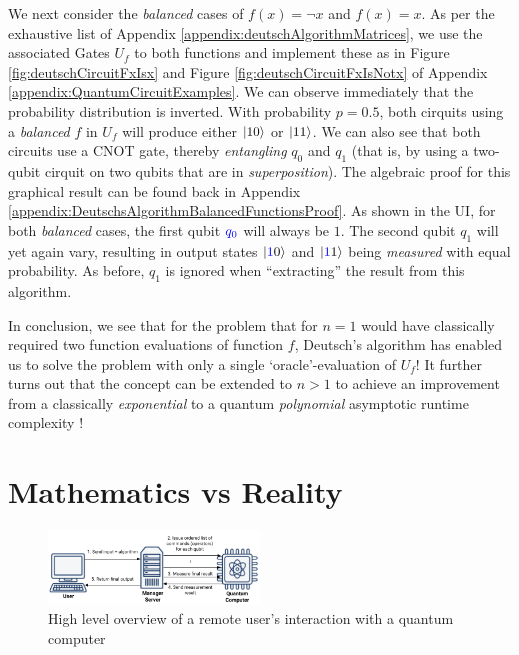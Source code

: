 \documentclass[conference]{IEEEtran}
\begin{document}
We next consider the \textit{balanced} cases of $f(x) = \lnot x$ and $f(x) = x$.
As per the exhaustive list of Appendix \ref{appendix:deutschAlgorithmMatrices}, we use the associated Gates $U_f$ to both functions
and implement these as in Figure \ref{fig:deutschCircuitFxIsx} and Figure \ref{fig:deutschCircuitFxIsNotx} of Appendix \ref{appendix:QuantumCircuitExamples}.
We can observe immediately that the probability distribution is inverted.
With probability $p = 0.5$, both cirquits using a \textit{balanced} $f$ in $U_f$ will
produce either $\ket{10}$ or $\ket{11}$.
We can also see that both circuits use a CNOT gate,
thereby \textit{entangling} $q_0$ and $q_1$ (that is, by using a two-qubit cirquit on
two qubits that are in \textit{superposition}).
The algebraic proof for this graphical result can be found back in Appendix \ref{appendix:DeutschsAlgorithmBalancedFunctionsProof}.
As shown in the UI, for both \textit{balanced} cases,
the first qubit $\textcolor{blue}{q_0}$ will always be $1$.
The second qubit $q_1$ will yet again vary, resulting in output states $\ket{\textcolor{blue}{1}0}$ and $\ket{\textcolor{blue}{1}1}$
being \textit{measured} with equal probability. As before, $q_1$ is ignored when ``extracting''
the result from this algorithm.

In conclusion, we see that for the problem that for $n=1$ would have classically required two function evaluations of function $f$,
Deutsch's algorithm has enabled us to solve the problem with only a single `oracle'-evaluation of $U_f$!
It further turns out that the concept can be extended to $n>1$ to achieve an improvement from a classically \textit{exponential}
to a quantum \textit{polynomial} asymptotic runtime complexity \cite{ref:deutschjozsaAlgorithm}!

\section{Mathematics vs Reality}

\begin{figure}[tbp]
    \centerline{
        \includegraphics[width=0.5\textwidth]{img/quantum_protocol_high_level.png}
    }
    \caption{High level overview of a remote user's interaction with a quantum computer}
    \label{fig:highLevelRemoteUserInteraction}
\end{figure}
\end{document}
